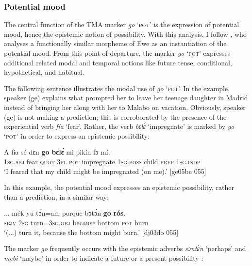 \subsubsection{Potential mood}\label{sec:6.7.4.1}

The central function of the TMA marker \textit{go} ‘\textsc{pot}’ is the expression of potential mood, hence the epistemic notion of possibility. With this analysis, I follow \citet{Essegbey2008}, who analyses a functionally similar morpheme of Ewe as an instantiation of the potential mood. From this point of departure, the marker \textit{go} ‘\textsc{pot}’ expresses additional related modal and temporal notions like future tense, conditional, hypothetical, and habitual. 


The following sentence illustrates the modal use of \textit{go} ‘\textsc{pot}’. In the example, speaker (ge) explains what prompted her to leave her teenage daughter in Madrid instead of bringing her along with her to Malabo on vacation. Obviously, speaker (ge) is not making a prediction; this is corroborated by the presence of the experiential verb \textit{fía} ‘fear’. Rather, the verb \textit{bɛlɛ́} ‘impregnate’ is marked by \textit{go} ‘\textsc{pot}’ in order to express an epistemic possibility:  



\ea%
    \label{ex:key:442}
    \gll A    fía  sé    dɛn  \textbf{go}  \textbf{bɛlɛ́}      mi    pikín  fɔ  mí.\\
\textsc{1sg.sbj}  fear  \textsc{quot}    \textsc{3pl}  \textsc{pot}  impregnate  \textsc{1sg.poss}  child  \textsc{prep}  \textsc{1sg.indp}\\

\glt ‘I feared that my child might be impregnated (on me).’ [ge05be 055]
\z

In this example, the potential mood expresses an epistemic possibility, rather than a prediction, in a similar way: 


\ea%
    \label{ex:key:443}
    \gll \op...\cp{}  mék    yu  tɔ́n=an,    porque  bɔtɔ́n  \textbf{go}  \textbf{rós}.\\
  {} \textsc{sbjv}    \textsc{2sg}  turn=\textsc{3sg.obj}  because  bottom  \textsc{pot}  burn\\

\glt ‘(...) turn it, because the bottom might burn.’ [dj03do 055]
\z

The marker \textit{go} frequently occurs with the epistemic adverbs \textit{sɔntɛ́n} ‘perhaps’ and \textit{mebi} ‘maybe’ in order to indicate a future  or a present possibility : 



